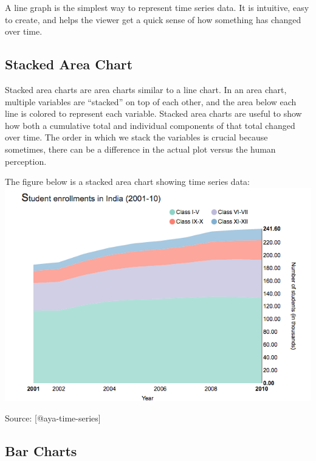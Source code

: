 \documentclass[]{book}
\theoremstyle{definition}
\theoremstyle{definition}
\theoremstyle{definition}
\theoremstyle{remark}
\begin{document}
A line graph is the simplest way to represent time series data. It is
intuitive, easy to create, and helps the viewer get a quick sense of how
something has changed over time.

\subsection{Stacked Area Chart}\label{stacked-area-chart}

Stacked area charts are area charts similar to a line chart. In an area
chart, multiple variables are ``stacked'' on top of each other, and the
area below each line is colored to represent each variable. Stacked area
charts are useful to show how both a cumulative total and individual
components of that total changed over time. The order in which we stack
the variables is crucial because sometimes, there can be a difference in
the actual plot versus the human perception.

The figure below is a stacked area chart showing time series data:
\includegraphics{images/aya-stacked.png}

Source: {[}@aya-time-series{]}

\subsection{Bar Charts}\label{bar-charts}
\end{document}
